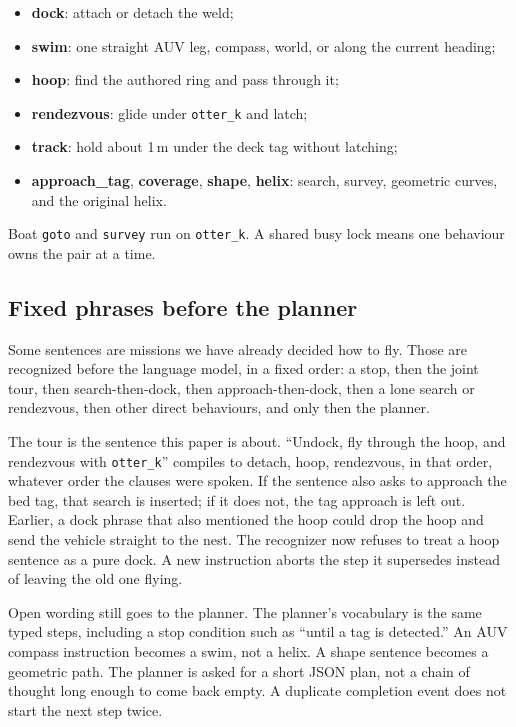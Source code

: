 \documentclass[conference]{IEEEtran}
\def\otterk{\texttt{otter\_k}}
\begin{document}
\begin{itemize}
\item \textbf{dock}: attach or detach the weld;
\item \textbf{swim}: one straight AUV leg, compass, world, or along the current heading;
\item \textbf{hoop}: find the authored ring and pass through it;
\item \textbf{rendezvous}: glide under \otterk{} and latch;
\item \textbf{track}: hold about 1\,m under the deck tag without latching;
\item \textbf{approach\_tag}, \textbf{coverage}, \textbf{shape}, \textbf{helix}: search, survey, geometric curves, and the original helix.
\end{itemize}

Boat \texttt{goto} and \texttt{survey} run on \otterk{}. A shared busy lock means one behaviour owns the pair at a time.

\subsection{Fixed phrases before the planner}
Some sentences are missions we have already decided how to fly. Those are recognized before the language model, in a fixed order: a stop, then the joint tour, then search-then-dock, then approach-then-dock, then a lone search or rendezvous, then other direct behaviours, and only then the planner.

The tour is the sentence this paper is about. ``Undock, fly through the hoop, and rendezvous with \otterk{}'' compiles to detach, hoop, rendezvous, in that order, whatever order the clauses were spoken. If the sentence also asks to approach the bed tag, that search is inserted; if it does not, the tag approach is left out. Earlier, a dock phrase that also mentioned the hoop could drop the hoop and send the vehicle straight to the nest. The recognizer now refuses to treat a hoop sentence as a pure dock. A new instruction aborts the step it supersedes instead of leaving the old one flying.

Open wording still goes to the planner. The planner's vocabulary is the same typed steps, including a stop condition such as ``until a tag is detected.'' An AUV compass instruction becomes a swim, not a helix. A shape sentence becomes a geometric path. The planner is asked for a short JSON plan, not a chain of thought long enough to come back empty. A duplicate completion event does not start the next step twice.
\end{document}
